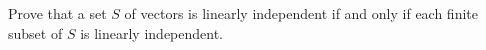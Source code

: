 Prove that a set $S$ of vectors is linearly independent if and only if each finite subset of $S$ is linearly independent.

\begin{tcolorbox}
	\begin{solution}
		
	\end{solution}
\end{tcolorbox}